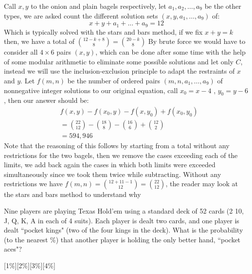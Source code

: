 \documentclass[12pt]{article}
\newcounter{problem}
\begin{document}
\begin{solution}[C]
   Call $x,y$ to the onion and plain bagels respectively, let $a_1,a_2,\ldots,a_9$ be the other types, we are asked count the different solution sets $(x,y,a_1,\ldots,a_9)$ of:
    $$ x+y+a_1+...+a_9 = 12$$
    Which is typically solved with the stars and bars method, if we fix $x+y=k$ then, we have a total of $\binom{12-k+8}{8} = \binom{20-k}{8}$
    By brute force we would have to consider all $4 \times 6$ pairs $(x,y)$, which can be done after some time with the help of some modular arithmetic to eliminate some possible solutions and let only $C$, instead we will use the inclusion-exclusion principle to adapt the restraints of $x$ and $y$.\medbreak
    Let $f(m,n)$ be the number of ordered pairs $(m,n,a_1,\ldots,a_9)$ of nonnegative integer solutions to our original equation, call $x_0=x-4$ , $y_0=y-6$, then our answer should be:
    \begin{align*}
        &f(x,y) - f(x_0,y) - f(x,y_0) + f(x_0,y_0) \\
        &= \binom{22}{12} - \binom{18}{8} - \binom{16}{6} + \binom{12}{2} \\
        &= \boxed{594,946}
    \end{align*}
    Note that the reasoning of this follows by starting from a total without any restrictions for the two bagels, then we remove the cases exceeding each of the limits, we add back again the cases in which both limits were exceeded simultaneously since we took them twice while subtracting. Without any restrictions we have $f(m,n) = \binom{12+11-1}{12}= \binom{22}{12}$, the reader may look at the stars and bars method to understand why
\end{solution}

\begin{problem}
   Nine players are playing Texas Hold'em using a standard deck of 52 cards (2 10, J, Q, K, A in each of 4 suits). Each player is dealt two cards, and one player is dealt ``pocket kings" (two of the four kings in the deck). What is the probability (to the nearest \%) that another player is holding the only better hand, ``pocket aces"? \par
   [1\%][2\%][3\%][4\%]
\end{problem}
\end{document}
